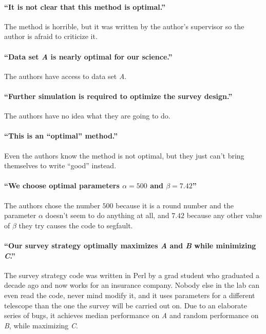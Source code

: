 \documentclass[12pt, preprint]{aastex}
\begin{document}
\paragraph{``It is not clear that this method is optimal.''}
The method is horrible, but it was written by the author's supervisor
so the author is afraid to criticize it.


\paragraph{``Data set \emph{A} is nearly optimal for our science.''}
The authors have access to data set \emph{A}.


\paragraph{``Further simulation is required to optimize the survey design.''}
%
%
The authors have no idea what they are going to do.

\paragraph{``This is an ``optimal'' method.''}
Even the authors know the method is not optimal, but they just can't bring
themselves to write ``good'' instead.

\paragraph{``We choose optimal parameters $\alpha=500$ and $\beta=7.42$''}
The authors chose the number $500$ because it is a round number and
the parameter $\alpha$ doesn't seem to do anything at all, and $7.42$
because any other value of $\beta$ they try causes the code to
segfault.

\paragraph{``Our survey strategy optimally maximizes \emph{A} and \emph{B} while minimizing \emph{C}.''}
The survey strategy code was written in Perl by a grad student who
graduated a decade ago and now works for an insurance company.  Nobody
else in the lab can even read the code, never mind modify it, and it
uses parameters for a different telescope than the one the survey will
be carried out on.  Due to an elaborate series of bugs, it achieves
median performance on \emph{A} and random performance on \emph{B},
while maximizing \emph{C}.
\end{document}
